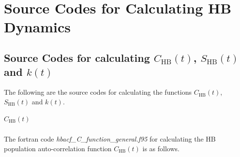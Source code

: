 \chapter{Source Codes for Calculating HB Dynamics}\label{code_hbacf}
\section{Source Codes for calculating $C_{\text{HB}}(t)$, $S_{\text{HB}}(t)$ and $k(t)$}
The following are the source codes for calculating the functions $C_{\text{HB}}(t)$, $S_{\text{HB}}(t)$ and $k(t)$.
\paragraph{$C_{\text{HB}}(t)$}
The fortran code \emph{hbacf\_C\_function\_general.f95} for calculating the HB population auto-correlation function $C_{\text{HB}}(t)$ is as follows.
